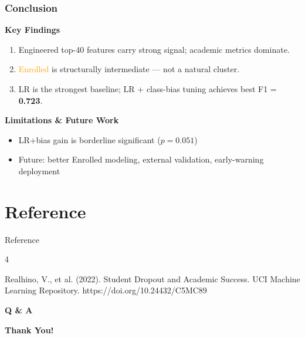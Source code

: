 \documentclass[aspectratio=169]{beamer}
\begin{document}
\begin{frame}
\frametitle{Conclusion}

\textbf{Key Findings}
\begin{enumerate}
    \item Engineered top-40 features carry strong signal; academic metrics dominate.
    \item \textcolor{orange}{Enrolled} is structurally intermediate — not a natural cluster.
    \item LR is the strongest baseline; LR + class-bias tuning achieves best F1 = \textbf{0.723}.
\end{enumerate}

\vspace{0.3cm}
\textbf{Limitations \& Future Work}
\begin{itemize}
    \item LR+bias gain is borderline significant ($p = 0.051$)
    \item Future: better Enrolled modeling, external validation, early-warning deployment
\end{itemize}

\end{frame}

\section{Reference}
\begin{frame}{Reference}
\begin{thebibliography}{4}

Realhino, V., et al. (2022).  Student Dropout and Academic Success.  UCI Machine Learning Repository. 
https://doi.org/10.24432/C5MC89


\end{thebibliography}
\end{frame}

\begin{frame}
\centering
\vspace{1cm}
{\Huge \textcolor{mainblue}{\textbf{Q \& A}}}
\vspace{1.5cm}

{\Large \textbf{Thank You!}}
\vspace{0.8cm}
\end{frame}
\end{document}
